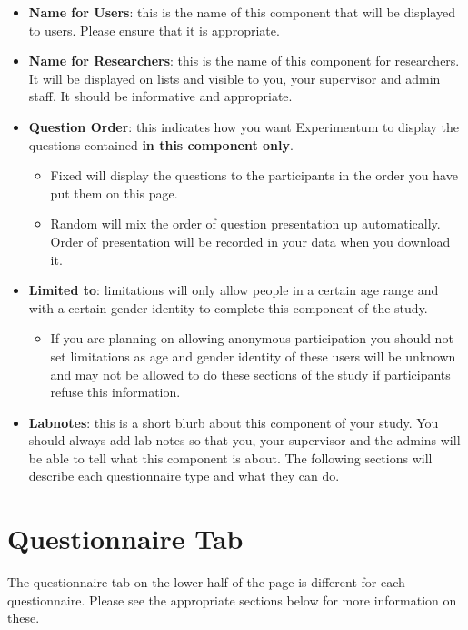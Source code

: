 \documentclass[]{book}
\providecommand{\tightlist}{%
  \setlength{\itemsep}{0pt}\setlength{\parskip}{0pt}}
\begin{document}
\begin{itemize}
\tightlist
\item
  \textbf{Name for Users}: this is the name of this component that will be displayed to users. Please ensure that it is appropriate.
\item
  \textbf{Name for Researchers}: this is the name of this component for researchers. It will be displayed on lists and visible to you, your supervisor and admin staff. It should be informative and appropriate.
\item
  \textbf{Question Order}: this indicates how you want Experimentum to display the questions contained \textbf{in this component only}.

  \begin{itemize}
  \tightlist
  \item
    Fixed will display the questions to the participants in the order you have put them on this page.
  \item
    Random will mix the order of question presentation up automatically. Order of presentation will be recorded in your data when you download it.
  \end{itemize}
\item
  \textbf{Limited to}: limitations will only allow people in a certain age range and with a certain gender identity to complete this component of the study.

  \begin{itemize}
  \tightlist
  \item
    If you are planning on allowing anonymous participation you should not set limitations as age and gender identity of these users will be unknown and may not be allowed to do these sections of the study if participants refuse this information.
  \end{itemize}
\item
  \textbf{Labnotes}: this is a short blurb about this component of your study. You should always add lab notes so that you, your supervisor and the admins will be able to tell what this component is about.
  The following sections will describe each questionnaire type and what they can do.
\end{itemize}

\hypertarget{questionnaire-tab}{%
\section{Questionnaire Tab}\label{questionnaire-tab}}

The questionnaire tab on the lower half of the page is different for each questionnaire. Please see the appropriate sections below for more information on these.
\end{document}

